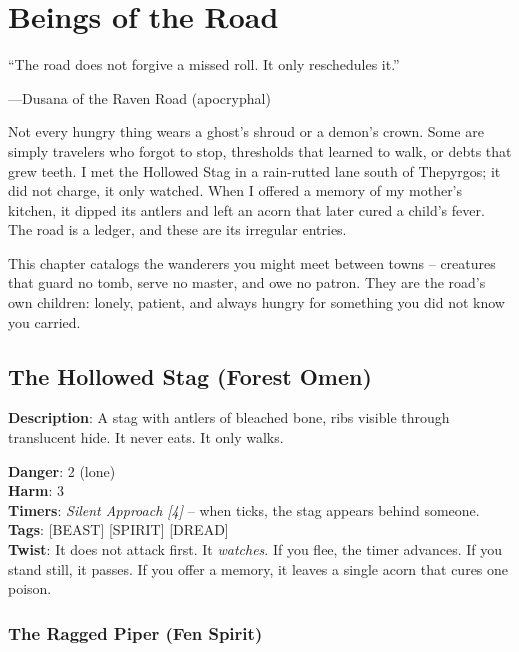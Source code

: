 \chapter{Beings of the Road}
\label{chap:beings-road}

\epigraph{``The road does not forgive a missed roll. It only reschedules it.''}{---Dusana of the Raven Road (apocryphal)}

Not every hungry thing wears a ghost's shroud or a demon's crown. Some are simply travelers who forgot to stop, thresholds that learned to walk, or debts that grew teeth. I met the Hollowed Stag in a rain-rutted lane south of Thepyrgos; it did not charge, it only watched. When I offered a memory of my mother's kitchen, it dipped its antlers and left an acorn that later cured a child's fever. The road is a ledger, and these are its irregular entries.

This chapter catalogs the wanderers you might meet between towns -- creatures that guard no tomb, serve no master, and owe no patron. They are the road's own children: lonely, patient, and always hungry for something you did not know you carried.

\section*{The Hollowed Stag (Forest Omen)}

\noindent\textbf{Description}: A stag with antlers of bleached bone, ribs visible through translucent hide. It never eats. It only walks.

\noindent\textbf{Danger}: 2 (lone)\\
\textbf{Harm}: 3\\
\textbf{Timers}: \emph{Silent Approach [4]} -- when ticks, the stag appears behind someone.\\
\textbf{Tags}: [BEAST] [SPIRIT] [DREAD]\\
\textbf{Twist}: It does not attack first. It \emph{watches}. If you flee, the timer advances. If you stand still, it passes. If you offer a memory, it leaves a single acorn that cures one poison.


\subsection*{The Ragged Piper (Fen Spirit)}

